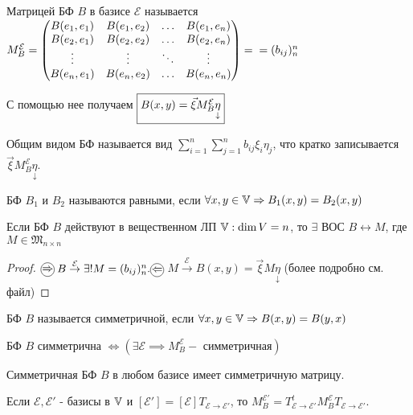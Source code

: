 \documentclass[../main.tex]{subfiles}
\begin{document}
\begin{definition}
    Матрицей БФ $B$ в базисе $\mathcal{E}$ называется $M_{B}^{\mathcal{E}} = \begin{pmatrix}
        B(e_{1},e_{1}) & B(e_{1},e_{2}) & \dots & B(e_{1},e_{n}) \\
        B(e_{2},e_{1}) & B(e_{2},e_{2}) & \dots & B(e_{2},e_{n}) \\
        \vdots & \vdots & \ddots & \vdots \\
        B(e_{n},e_{1}) & B(e_{n},e_{2}) & \dots & B(e_{n},e_{n})
    \end{pmatrix} =\\= (b_{ij})^{n}_{n}$
\end{definition}
С помощью нее получаем $\fbox{$B(x,y) = \vec{\xi} M_{B}^{\mathcal{E}}\underset{\downarrow}{\eta}$}$
\begin{definition}
    Общим видом БФ называется вид $\sum_{i  =1}^{n} \sum_{j=1}^{n} b_{ij}\xi_{i}\eta_{j}$, что кратко записывается $ \vec{\xi} M_{B}^{\mathcal{E}}\underset{\downarrow}{\eta}$.   
\end{definition}
\begin{definition}
    БФ $B_{1}$ и $B_{2}$ называются равными, если $\forall x,y \in \mathbb{V} \Rightarrow B_{1}(x,y)=B_{2}(x,y)$
\end{definition}
\begin{theorem}
    Если БФ $B$ действуют в вещественном ЛП $\mathbb{V}: \dim{V}=n$, то $\exists$ ВОС $B \leftrightarrow M$, где $M \in \mathfrak{M}_{n\times n}$
\end{theorem}
\begin{proof}
    $\tcircle{$\implies$}$ $B \overset{\mathcal{E}}{\to} \exists ! M = (b_{ij})^{n}_{n}. \\ 
    \tcircle{$\impliedby$}$ $M \overset{\mathcal{E}}{\to} B(x,y) = \vec{\xi} M \underset{\downarrow}{\eta}$ (более подробно см. файл)
\end{proof}
\begin{definition}
    БФ $B$ называется симметричной, если $\forall x,y \in \mathbb{V} \Rightarrow B(x,y) = B(y,x)$
\end{definition}
\begin{theorem}
    БФ $B$ симметрична $\Leftrightarrow \left( \exists \mathcal{E}\implies M_{B}^{\mathcal{E}} - \text{ симметричная} \right)$
\end{theorem}
\begin{corollary}
    Симметричная БФ $B$ в любом базисе имеет симметричную матрицу.
\end{corollary}
\begin{theorem}
    Если $\mathcal{E}, \mathcal{E'}$ - базисы в $\mathbb{V}$ и $[\mathcal{E'}] = [\mathcal{E}] T_{\mathcal{E}\to\mathcal{E'}}$, то $M_{B}^{\mathcal{E'}}= T_{\mathcal{E}\to\mathcal{E'}}^{t} M_{B}^{\mathcal{E}} T_{\mathcal{E}\to\mathcal{E'}}$.
\end{theorem}
\end{document}

